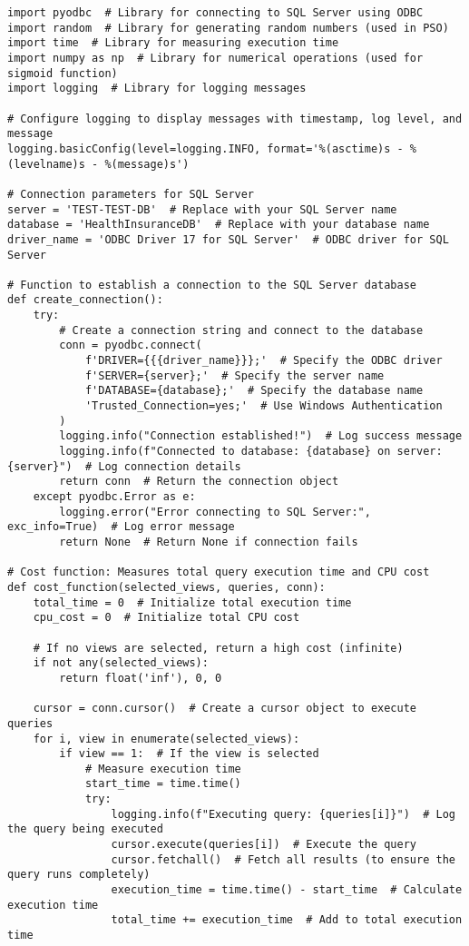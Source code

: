 \begin{lstlisting}[style=pythonstyle, caption={Python script to automate optimal view.}, label={lst:fullCode}]
import pyodbc  # Library for connecting to SQL Server using ODBC
import random  # Library for generating random numbers (used in PSO)
import time  # Library for measuring execution time
import numpy as np  # Library for numerical operations (used for sigmoid function)
import logging  # Library for logging messages

# Configure logging to display messages with timestamp, log level, and message
logging.basicConfig(level=logging.INFO, format='%(asctime)s - %(levelname)s - %(message)s')

# Connection parameters for SQL Server
server = 'TEST-TEST-DB'  # Replace with your SQL Server name
database = 'HealthInsuranceDB'  # Replace with your database name
driver_name = 'ODBC Driver 17 for SQL Server'  # ODBC driver for SQL Server

# Function to establish a connection to the SQL Server database
def create_connection():
    try:
        # Create a connection string and connect to the database
        conn = pyodbc.connect(
            f'DRIVER={{{driver_name}}};'  # Specify the ODBC driver
            f'SERVER={server};'  # Specify the server name
            f'DATABASE={database};'  # Specify the database name
            'Trusted_Connection=yes;'  # Use Windows Authentication
        )
        logging.info("Connection established!")  # Log success message
        logging.info(f"Connected to database: {database} on server: {server}")  # Log connection details
        return conn  # Return the connection object
    except pyodbc.Error as e:
        logging.error("Error connecting to SQL Server:", exc_info=True)  # Log error message
        return None  # Return None if connection fails

# Cost function: Measures total query execution time and CPU cost
def cost_function(selected_views, queries, conn):
    total_time = 0  # Initialize total execution time
    cpu_cost = 0  # Initialize total CPU cost

    # If no views are selected, return a high cost (infinite)
    if not any(selected_views):
        return float('inf'), 0, 0

    cursor = conn.cursor()  # Create a cursor object to execute queries
    for i, view in enumerate(selected_views):
        if view == 1:  # If the view is selected
            # Measure execution time
            start_time = time.time()
            try:
                logging.info(f"Executing query: {queries[i]}")  # Log the query being executed
                cursor.execute(queries[i])  # Execute the query
                cursor.fetchall()  # Fetch all results (to ensure the query runs completely)
                execution_time = time.time() - start_time  # Calculate execution time
                total_time += execution_time  # Add to total execution time


\end{lstlisting}

